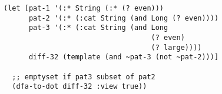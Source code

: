 \begin{lstlisting}[style=reclojureClojure]
(let [pat-1 '(:* String (:* (? even)))
      pat-2 '(:* (:cat String (and Long (? even))))
      pat-3 '(:* (:cat String (and Long
                                   (? even) 
                                   (? large))))
      diff-32 (template (and ~pat-3 (not ~pat-2)))]

  ;; emptyset if pat3 subset of pat2
  (dfa-to-dot diff-32 :view true))
\end{lstlisting}
